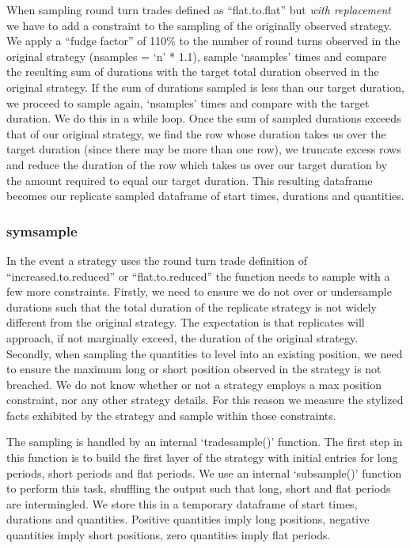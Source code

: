 When sampling round turn trades defined as ``flat.to.flat'' but
\emph{with replacement} we have to add a constraint to the sampling of
the originally observed strategy. We apply a ``fudge factor'' of 110\%
to the number of round turns observed in the original strategy (nsamples
= `n' * 1.1), sample `nsamples' times and compare the resulting sum of
durations with the target total duration observed in the original
strategy. If the sum of durations sampled is less than our target
duration, we proceed to sample again, `nsamples' times and compare with
the target duration. We do this in a while loop. Once the sum of sampled
durations exceeds that of our original strategy, we find the row whose
duration takes us over the target duration (since there may be more than
one row), we truncate excess rows and reduce the duration of the row
which takes us over our target duration by the amount required to equal
our target duration. This resulting dataframe becomes our replicate
sampled dataframe of start times, durations and quantities.

\hypertarget{symsample}{%
\subsubsection{symsample}\label{symsample}}

In the event a strategy uses the round turn trade definition of
``increased.to.reduced'' or ``flat.to.reduced'' the function needs to
sample with a few more constraints. Firstly, we need to ensure we do not
over or undersample durations such that the total duration of the
replicate strategy is not widely different from the original strategy.
The expectation is that replicates will approach, if not marginally
exceed, the duration of the original strategy. Secondly, when sampling
the quantities to level into an existing position, we need to ensure the
maximum long or short position observed in the strategy is not breached.
We do not know whether or not a strategy employs a max position
constraint, nor any other strategy details. For this reason we measure
the stylized facts exhibited by the strategy and sample within those
constraints.

The sampling is handled by an internal `tradesample()' function. The
first step in this function is to build the first layer of the strategy
with initial entries for long periods, short periods and flat periods.
We use an internal `subsample()' function to perform this task,
shuffling the output such that long, short and flat periods are
intermingled. We store this in a temporary dataframe of start times,
durations and quantities. Positive quantities imply long positions,
negative quantities imply short positions, zero quantities imply flat
periods.

